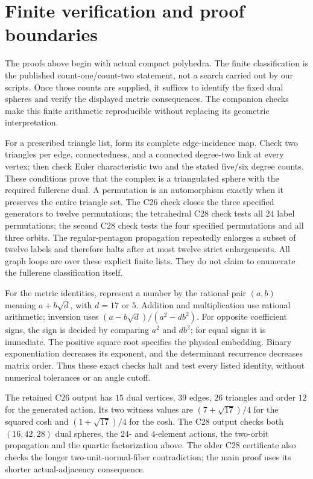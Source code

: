 \documentclass[11pt]{article}
\theoremstyle{remark}
\begin{document}
\section{Finite verification and proof boundaries}\label{sec:verification}

The proofs above begin with actual compact polyhedra. The finite
classification is the published count-one/count-two statement, not a
search carried out by our scripts. Once those counts are supplied, it
suffices to identify the fixed dual spheres and verify the displayed
metric consequences. The companion checks make this finite arithmetic
reproducible without replacing its geometric interpretation.

For a prescribed triangle list, form its complete edge-incidence map.
Check two triangles per edge, connectedness, and a connected degree-two
link at every vertex; then check Euler characteristic two and the stated
five/six degree counts. These conditions prove that the complex is a
triangulated sphere with the required fullerene dual. A permutation is
an automorphism exactly when it preserves the entire triangle set.
The C26 check closes the three specified generators to twelve
permutations; the tetrahedral C28 check tests all $24$ label permutations;
the second C28 check tests the four specified permutations and all three
orbits. The regular-pentagon propagation repeatedly enlarges a subset of
twelve labels and therefore halts after at most twelve strict enlargements.
All graph loops are over these explicit finite lists. They do not claim
to enumerate the fullerene classification itself.

For the metric identities, represent a number by the rational pair
$(a,b)$ meaning $a+b\sqrt d$, with $d=17$ or $5$. Addition and
multiplication use rational arithmetic; inversion uses
$(a-b\sqrt d)/(a^2-db^2)$. For opposite coefficient signs, the sign is
decided by comparing $a^2$ and $db^2$; for equal signs it is immediate.
The positive square root specifies the physical embedding. Binary
exponentiation decreases its exponent, and the determinant recurrence
decreases matrix order. Thus these exact checks halt and test every
listed identity, without numerical tolerances or an angle cutoff.

The retained C26 output has $15$ dual vertices, $39$ edges, $26$
triangles and order $12$ for the generated action. Its two witness values are
$(7+\sqrt{17})/4$ for the squared cosh and $(1+\sqrt{17})/4$ for the
cosh. The C28 output checks both $(16,42,28)$ dual spheres, the
$24$- and $4$-element actions, the two-orbit propagation and the
quartic factorization above. The older C28 certificate also checks the
longer two-unit-normal-fiber contradiction; the main proof uses its
shorter actual-adjacency consequence.
\end{document}
